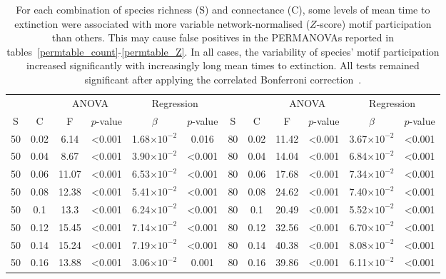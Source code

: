 \documentclass[12pt]{article}
\begin{document}
		\begin{table}[hb!]
			\caption{For each combination of species richness (S) and connectance (C), some levels of mean time to extinction were associated with more variable network-normalised ($Z$-score) motif participation than others. This may cause false positives in the PERMANOVAs reported in tables~\ref{permtable_count}-\ref{permtable_Z}. In all cases, the variability of species' motif participation increased significantly with increasingly long mean times to extinction. All tests remained significant after applying the correlated Bonferroni correction~\citep{Drezner2016}.}
			\label{betadisp_Z}
			\footnotesize
			\begin{tabular}{c c | c c| c c ||c c | c c | c c |}
            &&\multicolumn{2}{c|}{ANOVA}&\multicolumn{2}{c||}{Regression}&&&\multicolumn{2}{c|}{ANOVA}&\multicolumn{2}{c|}{Regression}\\
            S&C&F&$p$-value&$\beta$&$p$-value&S&C&F&$p$-value&$\beta$&$p$-value\\
            \hline
            50  & 0.02  & 6.14  & \textless0.001  & 1.68$\times10^{-2}$ & 0.016 & 80  & 0.02  & 11.42 & \textless0.001  & 3.67$\times10^{-2}$ & \textless0.001  \\
            50  & 0.04  & 8.67  & \textless0.001  & 3.90$\times10^{-2}$ & \textless0.001  & 80  & 0.04  & 14.04 & \textless0.001  & 6.84$\times10^{-2}$ & \textless0.001  \\
            50  & 0.06  & 11.07 & \textless0.001  & 6.53$\times10^{-2}$ & \textless0.001  & 80  & 0.06  & 17.68 & \textless0.001  & 7.34$\times10^{-2}$ & \textless0.001  \\
            50  & 0.08  & 12.38 & \textless0.001  & 5.41$\times10^{-2}$ & \textless0.001  & 80  & 0.08  & 24.62 & \textless0.001  & 7.40$\times10^{-2}$ & \textless0.001  \\
            50  & 0.1 & 13.3  & \textless0.001  & 6.24$\times10^{-2}$ & \textless0.001  & 80  & 0.1 & 20.49 & \textless0.001  & 5.52$\times10^{-2}$ & \textless0.001  \\
            50  & 0.12  & 15.45 & \textless0.001  & 7.14$\times10^{-2}$ & \textless0.001  & 80  & 0.12  & 32.56 & \textless0.001  & 6.70$\times10^{-2}$ & \textless0.001  \\
            50  & 0.14  & 15.24 & \textless0.001  & 7.19$\times10^{-2}$ & \textless0.001  & 80  & 0.14  & 40.38 & \textless0.001  & 8.08$\times10^{-2}$ & \textless0.001  \\
            50  & 0.16  & 13.88 & \textless0.001  & 3.06$\times10^{-2}$ & 0.001 & 80  & 0.16  & 39.86 & \textless0.001  & 6.11$\times10^{-2}$ & \textless0.001  \\

\end{tabular}
\end{table}
\end{document}
